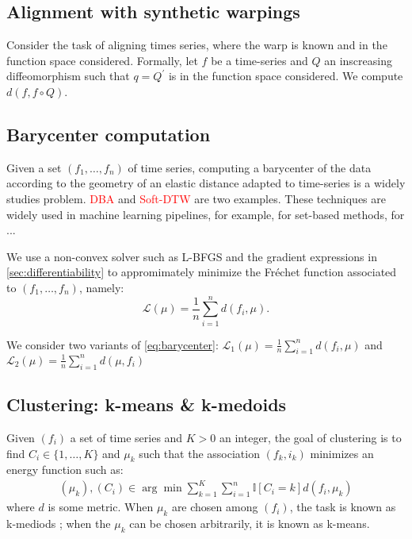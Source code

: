 \subsection{Alignment with synthetic warpings}

Consider the task of aligning times series, where the warp is known and in the function space considered. Formally, let $f$ be a time-series and $Q$ an inscreasing diffeomorphism such that $q = Q^\prime$ is in the function space considered. We compute $d(f, f\circ Q)$.

\subsection{Barycenter computation}
Given a set $(f_1, \ldots, f_n)$ of time series, computing a barycenter of the data according to the geometry of an elastic distance adapted to time-series is a widely studies problem. \textcolor{red}{DBA} and \textcolor{red}{Soft-DTW} are two examples. These techniques are widely used in machine learning pipelines, for example, for set-based methods, for ...

We use a non-convex solver such as L-BFGS and the gradient expressions in \cref{sec:differentiability} to appromimately minimize the Fréchet function associated to $(f_1, \ldots, f_n)$, namely:
\begin{equation}\label{eq:barycenter}
    \mathcal L(\mu) = \frac{1}{n}\sum_{i=1}^n d(f_i, \mu).
\end{equation}

We consider two variants of \cref{eq:barycenter}: $\mathcal L_1(\mu) = \frac{1}{n}\sum_{i=1}^n d(f_i,\mu)$ and $\mathcal L_2(\mu) = \frac{1}{n}\sum_{i=1}^n d(\mu, f_i)$



\subsection{Clustering: k-means \& k-medoids}

Given $(f_i)$ a set of time series and $K > 0$ an integer, the goal of clustering is to find $C_i \in \lbrace 1, \ldots, K\rbrace$ and $\mu_k$ such that the association $(f_k, i_k)$ minimizes an energy function such as:
\begin{align}
    (\mu_k), (C_i) \in \arg\min \sum_{k=1}^K\sum_{i=1}^n \mathbb I[C_i = k]d(f_i, \mu_k)
\end{align}
where $d$ is some metric. When $\mu_k$ are chosen among $(f_i)$, the task is known as k-mediods ; when the $\mu_k$ can be chosen arbitrarily, it is known as k-means.
